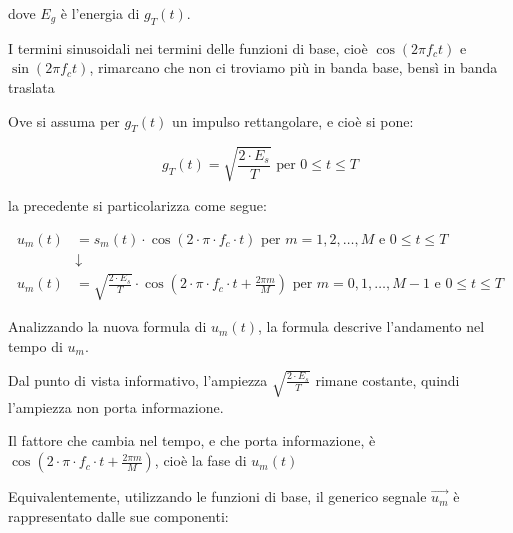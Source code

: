 dove $E_g$ è l'energia di $g_T (t)$. \newline 

\begin{tcolorbox}
    I termini sinusoidali nei termini delle funzioni di base, cioè $\cos(2 \pi f_c t)$ e $\sin(2 \pi f_c t)$, 
    rimarcano che non ci troviamo più in banda base, bensì in banda traslata
\end{tcolorbox}

Ove si assuma per $g_T (t)$ un impulso rettangolare, e cioè si pone: 

{
    \Large 
    \begin{equation}
        g_T (t) = \sqrt{\frac{2 \cdot E_s}{T}} \text{ per } 0 \le t \le T
    \end{equation}
}

la precedente si particolarizza come segue: 

{
    \Large 
    \begin{equation}
        \begin{split}
          u_m (t) 
        &= 
        s_m (t)
        \cdot 
        \cos(2 \cdot \pi \cdot f_c \cdot t) 
        \text{ per } m = 1, 2, \dots, M \text{ e } 0 \le t \le T
        \\
        &\downarrow
        \\
        u_m (t) 
        &= 
        \sqrt{\frac{2 \cdot E_s}{T}}
        \cdot 
        \cos(2 \cdot \pi \cdot f_c \cdot t + \frac{2 \pi m}{M}) 
        \text{ per } m = 0, 1, \dots, M - 1 \text{ e } 0 \le t \le T
        \end{split}
    \end{equation}
}

\begin{tcolorbox}
    Analizzando la nuova formula di $u_m (t)$, 
    la formula descrive l'andamento nel tempo di $u_m$. \newline 

    Dal punto di vista informativo, l'ampiezza $\sqrt{\frac{2 \cdot E_s}{T}}$ rimane costante, 
    quindi l'ampiezza non porta informazione. \newline 

    Il fattore che cambia nel tempo, e che porta informazione, 
    è $\cos(2 \cdot \pi \cdot f_c \cdot t + \frac{2 \pi m}{M}) $, 
    cioè la fase di $u_m (t)$
\end{tcolorbox}

Equivalentemente, 
utilizzando le funzioni di base, 
il generico segnale $\overrightarrow{u_m}$ è rappresentato dalle sue componenti: 

